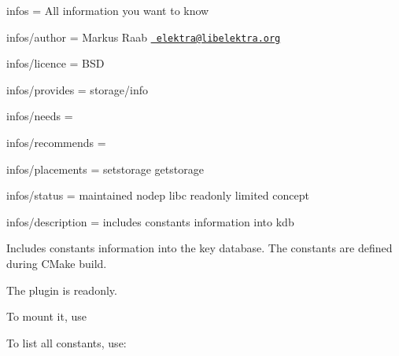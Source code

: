 
\begin{DoxyItemize}
\item infos = All information you want to know
\item infos/author = Markus Raab \href{mailto:elektra@libelektra.org}{\texttt{ elektra@libelektra.\+org}}
\item infos/licence = B\+SD
\item infos/provides = storage/info
\item infos/needs =
\item infos/recommends =
\item infos/placements = setstorage getstorage
\item infos/status = maintained nodep libc readonly limited concept
\item infos/description = includes constants information into kdb
\end{DoxyItemize}

Includes constants information into the key database. The constants are defined during C\+Make build.

The plugin is readonly.

To mount it, use


\begin{DoxyCode}{0}
\end{DoxyCode}


To list all constants, use\+:


